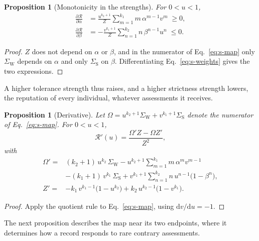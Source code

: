 \documentclass[10pt]{wlscirep}
\newcommand{\Rmap}{\mathscr{R}}            %
\newcommand{\dd}{\mathrm{d}}
\theoremstyle{plain}
\newtheorem{proposition}[lemma]{Proposition}
\theoremstyle{remark}
\begin{document}
\begin{proposition}[Monotonicity in the strengths]\label{prop:monotone}
For $0<u<1$,
\begin{equation}
\begin{aligned}
\frac{\partial\Rmap}{\partial\alpha}&=\frac{u^{k_2+1}}{Z}\sum_{m=1}^{k_1}m\,\alpha^{m-1}v^m\;\geq0,\\[2pt]
\frac{\partial\Rmap}{\partial\beta}&=-\frac{v^{k_1+1}}{Z}\sum_{n=1}^{k_2}n\,\beta^{n-1}u^n\;\leq0.
\end{aligned}
\label{eq:s-monotonicity}
\end{equation}
\end{proposition}
\begin{proof}
$Z$ does not depend on $\alpha$ or $\beta$, and in the numerator of Eq.~\eqref{eq:s-map} only $\Sigma_{\mathrm W}$ depends on $\alpha$ and only $\Sigma_{\mathrm S}$ on $\beta$. Differentiating Eq.~\eqref{eq:s-weights} gives the two expressions.
\end{proof}

A higher tolerance strength thus raises, and a higher strictness strength lowers, the reputation of every individual, whatever assessments it receives.

\begin{proposition}[Derivative]\label{prop:derivative}
Let $\Omega=u^{k_2+1}\Sigma_{\mathrm W}+v^{k_1+1}\Sigma_{\mathrm S}$ denote the numerator of Eq.~\eqref{eq:s-map}. For $0<u<1$,
\begin{equation}
\Rmap'(u)=\frac{\Omega'Z-\Omega Z'}{Z^2},
\label{eq:s-derivative}
\end{equation}
with
\begin{equation}
\begin{aligned}
\Omega'={}&(k_2+1)\,u^{k_2}\,\Sigma_{\mathrm W}-u^{k_2+1}\sum_{m=1}^{k_1}m\,\alpha^m v^{m-1}\\
&-(k_1+1)\,v^{k_1}\,\Sigma_{\mathrm S}+v^{k_1+1}\sum_{n=1}^{k_2}n\,u^{n-1}\bigl(1-\beta^n\bigr),\\[2pt]
Z'={}&-k_1\,v^{k_1-1}\bigl(1-u^{k_2}\bigr)+k_2\,u^{k_2-1}\bigl(1-v^{k_1}\bigr).
\end{aligned}
\label{eq:s-derivative-parts}
\end{equation}
\end{proposition}
\begin{proof}
Apply the quotient rule to Eq.~\eqref{eq:s-map}, using $\dd v/\dd u=-1$.
\end{proof}

The next proposition describes the map near its two endpoints, where it determines how a record responds to rare contrary assessments.
\end{document}
